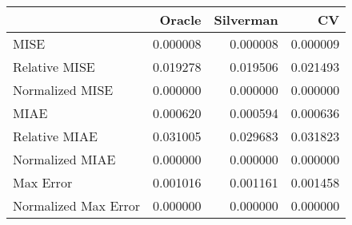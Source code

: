 \begin{tabular}{lrrr}
  \hline
 & Oracle & Silverman & CV \\ 
  \hline
MISE & 0.000008 & 0.000008 & 0.000009 \\ 
  Relative MISE & 0.019278 & 0.019506 & 0.021493 \\ 
  Normalized MISE & 0.000000 & 0.000000 & 0.000000 \\ 
  MIAE & 0.000620 & 0.000594 & 0.000636 \\ 
  Relative MIAE & 0.031005 & 0.029683 & 0.031823 \\ 
  Normalized MIAE & 0.000000 & 0.000000 & 0.000000 \\ 
  Max Error & 0.001016 & 0.001161 & 0.001458 \\ 
  Normalized Max Error & 0.000000 & 0.000000 & 0.000000 \\ 
   \hline
\end{tabular}
